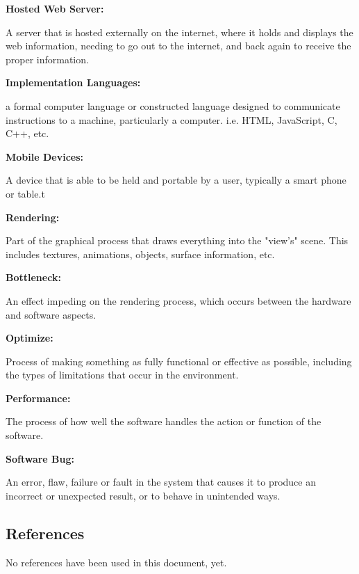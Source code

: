 \documentclass[letterpaper,10pt,draftclsnofoot,onecolumn,compsoc]{IEEEtran}
\begin{document}
\begin{singlespace}
\begin{enumerate}[labelsep=2em,leftmargin=.5in]
    {\item \bfseries Hosted Web Server: } A server that is hosted externally on the internet, where it holds and displays the web information, needing to go out to the internet, and back again to receive the proper information. \vspace{.1cm}
    {\item \bfseries Implementation Languages: } a formal computer language or constructed language designed to communicate instructions to a machine, particularly a computer. i.e. HTML, JavaScript, C, C++, etc. \vspace{.1cm}
    {\item \bfseries Mobile Devices: } A device that is able to be held and portable by a user, typically a smart phone or table.t\vspace{.1cm}
    {\item \bfseries Rendering: } Part of the graphical process that draws everything into the "view's" scene. This includes textures, animations, objects, surface information, etc. \vspace{.1cm}
    {\item \bfseries Bottleneck: } An effect impeding on the rendering process, which occurs between the hardware and software aspects. \vspace{.1cm}
    {\item \bfseries Optimize: } Process of making something as fully functional or effective as possible, including the types of limitations that occur in the environment. \vspace{.1cm}
    {\item \bfseries Performance: } The process of how well the software handles the action or function of the software.
    {\item \bfseries Software Bug: } An error, flaw, failure or fault in the system that causes it to produce an incorrect or unexpected result, or to behave in unintended ways. \vspace{.1cm}
\end{enumerate}

\end{singlespace}

\subsection{References}
\begin{singlespace}
\noindent
No references have been used in this document, yet.
\end{singlespace}
\end{document}
